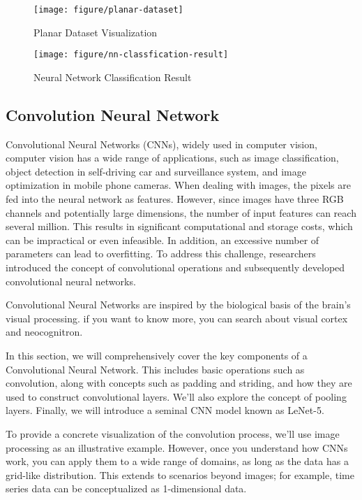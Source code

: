 \documentclass{article}
\begin{document}
\begin{figure}[htbp]
    \centering
    \begin{minipage}[t]{0.48\textwidth}
    \centering
    \texttt{[image: figure/planar-dataset]}
    \caption{Planar Dataset Visualization}
    \end{minipage}
    \begin{minipage}[t]{0.48\textwidth}
    \centering
    \texttt{[image: figure/nn-classfication-result]}
    \caption{Neural Network Classification Result}
    \end{minipage}
    \end{figure}


    \newpage
	\subsection{Convolution Neural Network}

    Convolutional Neural Networks (CNNs), widely used in computer vision, computer vision has a wide range of applications, such as image classification, object detection in self-driving car and surveillance system, and image optimization in mobile phone cameras. When dealing with images, the pixels are fed into the neural network as features. However, since images have three RGB channels and potentially large dimensions, the number of input features can reach several million. This results in significant computational and storage costs, which can be impractical or even infeasible. In addition, an excessive number of parameters can lead to overfitting. To address this challenge, researchers introduced the concept of convolutional operations and subsequently developed convolutional neural networks.

Convolutional Neural Networks are inspired by the biological basis of the brain's visual processing.  if you want to know more, you can search about visual cortex and neocognitron.

In this section, we will comprehensively cover the key components of a Convolutional Neural Network. This includes basic operations such as convolution, along with concepts such as padding and striding, and how they are used to construct convolutional layers. We'll also explore the concept of pooling layers. Finally, we will introduce a seminal CNN model known as LeNet-5.

To provide a concrete visualization of the convolution process, we'll use image processing as an illustrative example. However, once you understand how CNNs work, you can apply them to a wide range of domains, as long as the data has a grid-like distribution. This extends to scenarios beyond images; for example, time series data can be conceptualized as 1-dimensional data.
\end{document}
